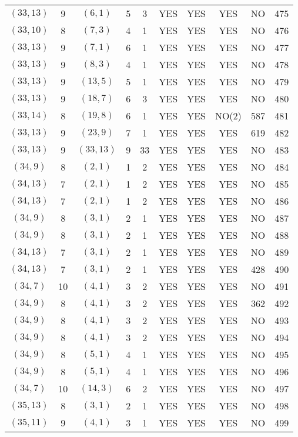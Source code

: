 \begin{longtable}{|c|c|c|c|c|c|c|c|c|c|}
$(33, 13)$ & 9 & $(6, 1)$ & 5 & 3 & YES & YES & YES & NO & 475\\
$(33, 10)$ & 8 & $(7, 3)$ & 4 & 1 & YES & YES & YES & NO & 476\\
$(33, 13)$ & 9 & $(7, 1)$ & 6 & 1 & YES & YES & YES & NO & 477\\
$(33, 13)$ & 9 & $(8, 3)$ & 4 & 1 & YES & YES & YES & NO & 478\\
$(33, 13)$ & 9 & $(13, 5)$ & 5 & 1 & YES & YES & YES & NO & 479\\
$(33, 13)$ & 9 & $(18, 7)$ & 6 & 3 & YES & YES & YES & NO & 480\\
$(33, 14)$ & 8 & $(19, 8)$ & 6 & 1 & YES & YES & NO(2) & 587 & 481\\
$(33, 13)$ & 9 & $(23, 9)$ & 7 & 1 & YES & YES & YES & 619 & 482\\
$(33, 13)$ & 9 & $(33, 13)$ & 9 & 33 & YES & YES & YES & NO & 483\\
$(34, 9)$ & 8 & $(2, 1)$ & 1 & 2 & YES & YES & YES & NO & 484\\
$(34, 13)$ & 7 & $(2, 1)$ & 1 & 2 & YES & YES & YES & NO & 485\\
$(34, 13)$ & 7 & $(2, 1)$ & 1 & 2 & YES & YES & YES & NO & 486\\
$(34, 9)$ & 8 & $(3, 1)$ & 2 & 1 & YES & YES & YES & NO & 487\\
$(34, 9)$ & 8 & $(3, 1)$ & 2 & 1 & YES & YES & YES & NO & 488\\
$(34, 13)$ & 7 & $(3, 1)$ & 2 & 1 & YES & YES & YES & NO & 489\\
$(34, 13)$ & 7 & $(3, 1)$ & 2 & 1 & YES & YES & YES & 428 & 490\\
$(34, 7)$ & 10 & $(4, 1)$ & 3 & 2 & YES & YES & YES & NO & 491\\
$(34, 9)$ & 8 & $(4, 1)$ & 3 & 2 & YES & YES & YES & 362 & 492\\
$(34, 9)$ & 8 & $(4, 1)$ & 3 & 2 & YES & YES & YES & NO & 493\\
$(34, 9)$ & 8 & $(4, 1)$ & 3 & 2 & YES & YES & YES & NO & 494\\
$(34, 9)$ & 8 & $(5, 1)$ & 4 & 1 & YES & YES & YES & NO & 495\\
$(34, 9)$ & 8 & $(5, 1)$ & 4 & 1 & YES & YES & YES & NO & 496\\
$(34, 7)$ & 10 & $(14, 3)$ & 6 & 2 & YES & YES & YES & NO & 497\\
$(35, 13)$ & 8 & $(3, 1)$ & 2 & 1 & YES & YES & YES & NO & 498\\
$(35, 11)$ & 9 & $(4, 1)$ & 3 & 1 & YES & YES & YES & NO & 499\\

\end{longtable}
